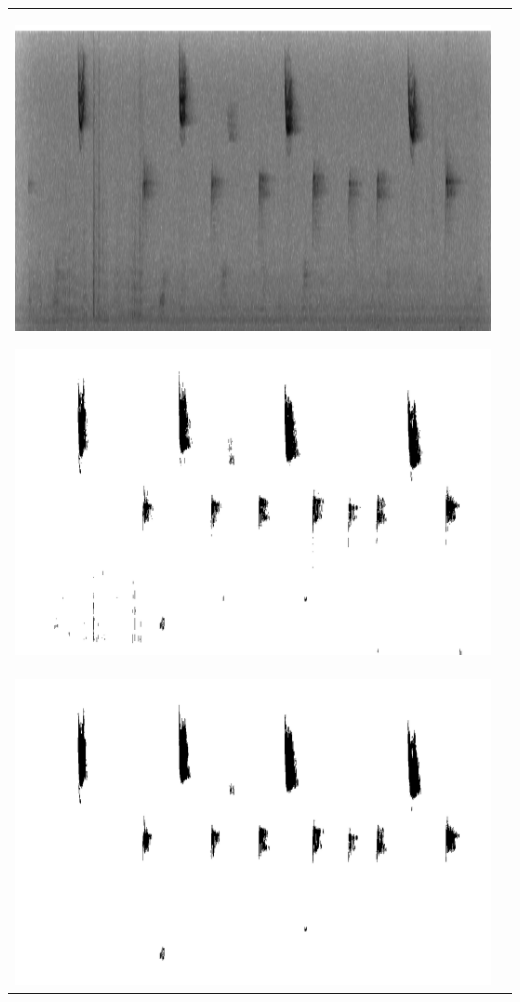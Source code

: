 \documentclass[portrait,final,paperwidth=31truein,paperheight=38truein,fontscale=0.35, margin=1truein]{baposter}
\begin{document}
\begin{poster}
{\begin{center}
\begin{tabular}{cc}
\begin{minipage}{1.5truein}
\includegraphics[height=1truein]{images/original}
\end{minipage}
\begin{minipage}{1.5truein}
\includegraphics[height=1truein]{images/Median_clipped}
\end{minipage}\\
\begin{minipage}{1truein}
\includegraphics[height=1truein]{images/Eroded_and_propagated}

\end{minipage}
\end{tabular}
\end{center}}
\end{poster}
\end{document}

